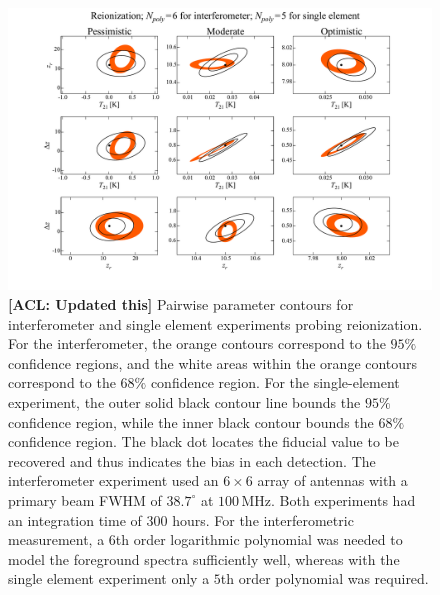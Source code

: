 \documentclass[twocolumn,apj,numberedappendix]{emulateapj}
\newcommand{\acl}[1]{{\color{red} \textbf{[ACL:  #1]}}}
\begin{document}
\begin{figure}[t]
	\centering
	\includegraphics[width=1.00\textwidth,trim=3cm 2cm 3cm 0cm,clip]{figures/reionContoursPoly6Poly5.pdf}
	\caption{\acl{Updated this} Pairwise parameter contours for interferometer and single element experiments probing reionization. For the interferometer, the orange contours correspond to the $95\%$ confidence regions, and the white areas within the orange contours correspond to the $68\%$ confidence region. For the single-element experiment, the outer solid black contour line bounds the $95\%$ confidence region, while the inner black contour bounds the $68\%$ confidence region. The black dot locates the fiducial value to be recovered and thus indicates the bias in each detection. The interferometer experiment used an $6\times 6$ array of antennas with a primary beam FWHM of $38.7^\circ$ at $100\,\textrm{MHz}$. Both experiments had an integration time of 300 hours. For the interferometric measurement, a $6$th order logarithmic polynomial was needed to model the foreground spectra sufficiently well, whereas with the single element experiment only a $5$th order polynomial was required.}
	\label{fig:reionContoursPoly7Poly7}
\end{figure}
\end{document}
